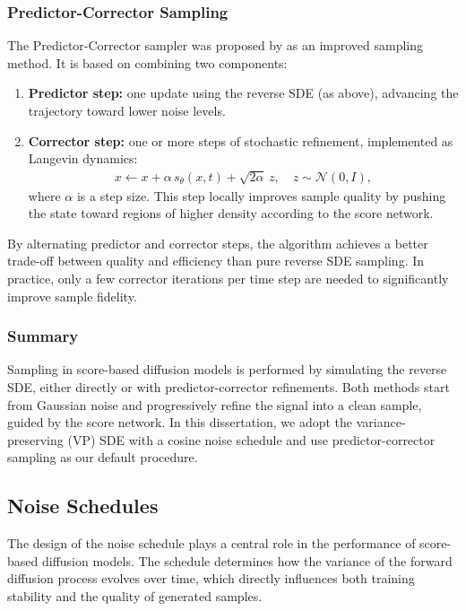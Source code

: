 \documentclass[a4paper,12pt]{article}
\begin{document}
\subsubsection{Predictor-Corrector Sampling}
The Predictor-Corrector sampler was proposed by \cite{song2021ScoreBasedGenerativeModeling} as an improved sampling method. It is based on combining two components:
\begin{enumerate}
  \item \textbf{Predictor step:} one update using the reverse SDE (as above), advancing the trajectory toward lower noise levels.  
  \item \textbf{Corrector step:} one or more steps of stochastic refinement, implemented as Langevin dynamics:
    \begin{align*}
        x \leftarrow x + \alpha\, s_\theta(x,t) + \sqrt{2\alpha}\,z, \quad z \sim \mathcal{N}(0,I),
    \end{align*}
    where \(\alpha\) is a step size. This step locally improves sample quality by pushing the state toward regions of higher density according to the score network.
\end{enumerate}
By alternating predictor and corrector steps, the algorithm achieves a better trade-off between quality and efficiency than pure reverse SDE sampling. 
In practice, only a few corrector iterations per time step are needed to significantly improve sample fidelity.

\subsubsection{Summary}

Sampling in score-based diffusion models is performed by simulating the reverse SDE, either directly or with predictor-corrector refinements. Both methods start from Gaussian noise and progressively refine the signal into a clean sample, guided by the score network. In this dissertation, we adopt the variance-preserving (VP) SDE with a cosine noise schedule and use predictor-corrector sampling as our default procedure.

\subsection{Noise Schedules}
The design of the noise schedule plays a central role in the performance of score-based diffusion models. 
The schedule determines how the variance of the forward diffusion process evolves over time, which directly influences both training stability and the quality of generated samples.
\end{document}
